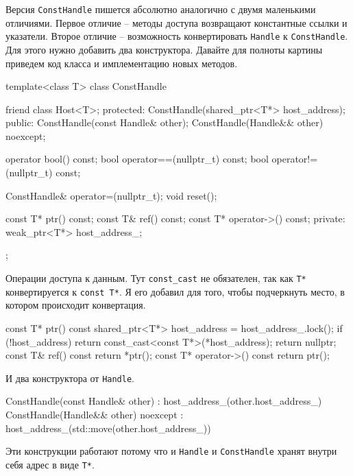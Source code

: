 Версия \verb"ConstHandle" пишется абсолютно аналогично с двумя маленькими отличиями.
Первое отличие -- методы доступа возвращают константные ссылки и указатели.
Второе отличие -- возможность конвертировать \verb"Handle" к \verb"ConstHandle".
Для этого нужно добавить два конструктора.
Давайте для полноты картины приведем код класса и имплементацию новых методов.
\begin{cppcode}
template<class T>
class ConstHandle {
  friend class Host<T>;
protected:
  ConstHandle(shared_ptr<T*> host_address);
public:
  ConstHandle(const Handle& other);
  ConstHandle(Handle&& other) noexcept;

  operator bool() const;
  bool operator==(nullptr_t) const;
  bool operator!=(nullptr_t) const;

  ConstHandle& operator=(nullptr_t);
  void reset();

  const T* ptr() const;
  const T& ref() const;
  const T* operator->() const;
private:
  weak_ptr<T*> host_address_;
};
\end{cppcode}
Операции доступа к данным.
Тут \verb"const_cast" не обязателен, так как \verb"T*" конвертируется к \verb"const T*".
Я его добавил для того, чтобы подчеркнуть место, в котором происходит конвертация.
\begin{cppcode}
const T* ptr() const {
  shared_ptr<T*> host_address = host_address_.lock();
  if (!host_address)
    return const_cast<const T*>(*host_address);
  return nullptr;
}
const T& ref() const {
  return *ptr();
}
const T* operator->() const {
  return ptr();
}
\end{cppcode}
И два конструктора от \verb"Handle".
\begin{cppcode}
ConstHandle(const Handle& other) : host_address_(other.host_address_) {
}
ConstHandle(Handle&& other) noexcept : host_address_(std::move(other.host_address_)) {
}
\end{cppcode}
Эти конструкции работают потому что и \verb"Handle" и \verb"ConstHandle" хранят внутри себя адрес в виде \verb"T*".
